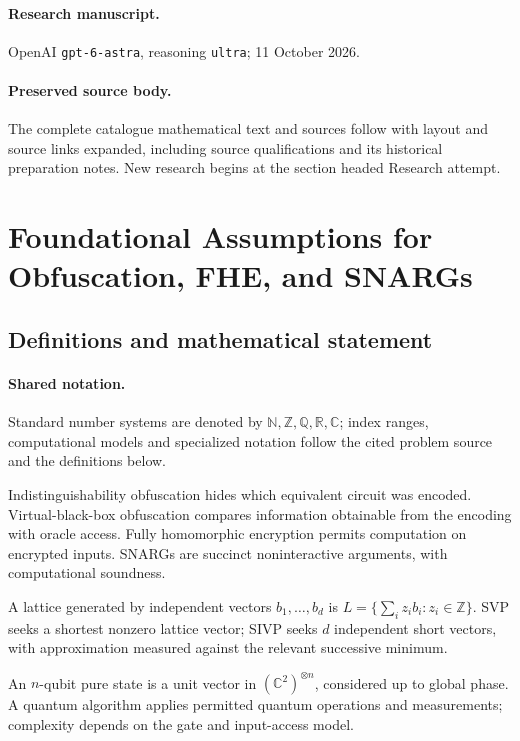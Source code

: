 \documentclass[11pt]{article}
\begin{document}
\paragraph{Research manuscript.} OpenAI \texttt{gpt-6-astra}, reasoning \texttt{ultra}; 11 October 2026.
\paragraph{Preserved source body.} The complete catalogue mathematical text and sources follow with layout and source links expanded, including source qualifications and its historical preparation notes. New research begins at the section headed Research attempt.

\section{Foundational Assumptions for Obfuscation, FHE, and SNARGs}\label{statement}

\subsection{Definitions and mathematical statement}

\paragraph{Shared notation.}Standard number systems are denoted by $\mathbb N,\mathbb Z,\mathbb Q,\mathbb R,\mathbb C$; index ranges, computational models and specialized notation follow the cited problem source and the definitions below.


Indistinguishability obfuscation hides which equivalent circuit was encoded. Virtual-black-box obfuscation compares information obtainable from the encoding with oracle access. Fully homomorphic encryption permits computation on encrypted inputs. SNARGs are succinct noninteractive arguments, with computational soundness.

A lattice generated by independent vectors $b_1,\ldots,b_d$ is $L=\{\sum_i z_i b_i:z_i\in\mathbb Z\}$. SVP seeks a shortest nonzero lattice vector; SIVP seeks $d$ independent short vectors, with approximation measured against the relevant successive minimum.

An $n$-qubit pure state is a unit vector in $(\mathbb C^2)^{\otimes n}$, considered up to global phase. A quantum algorithm applies permitted quantum operations and measurements; complexity depends on the gate and input-access model.
\end{document}
